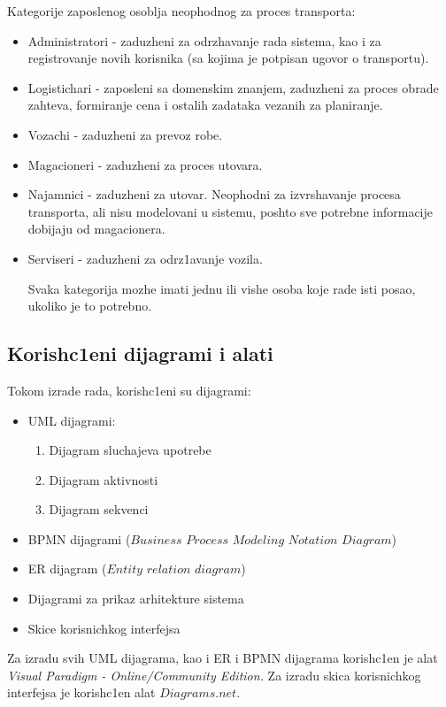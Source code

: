 Kategorije zaposlenog osoblja neophodnog za proces transporta:
\begin{itemize}
    \item Administratori - zaduzheni za odrzhavanje rada sistema, kao i za registrovanje novih korisnika (sa kojima je potpisan ugovor o transportu).
    \item Logistichari - zaposleni sa domenskim znanjem, zaduzheni za proces obrade zahteva, formiranje cena i ostalih zadataka vezanih za planiranje.
    \item Vozachi - zaduzheni za prevoz robe.
    \item Magacioneri - zaduzheni za proces utovara.
    \item Najamnici - zaduzheni za utovar. Neophodni za izvrshavanje procesa transporta, ali nisu modelovani u sistemu, poshto sve potrebne informacije dobijaju od magacionera.  
    \item Serviseri - zaduzheni za odrz1avanje vozila.
    
Svaka kategorija mozhe imati jednu ili vishe osoba koje rade isti posao, ukoliko je to potrebno.

\end{itemize}

\subsection{Korish\-c1eni dijagrami i alati}
Tokom izrade rada, korish\-c1eni su dijagrami:
\begin{itemize}
    \item UML dijagrami:
    \begin{enumerate}
     \item Dijagram sluchajeva upotrebe
    \item Dijagram aktivnosti
    \item Dijagram sekvenci
    \end{enumerate}
    \item BPMN dijagrami ($Business$ $Process$ $Modeling$ $Notation$ $Diagram$)
    \item ER dijagram ($Entity$ $relation$ $diagram$)
    \item Dijagrami za prikaz arhitekture sistema
    \item Skice korisnichkog interfejsa
    
\end{itemize}

Za izradu svih UML dijagrama, kao i ER i BPMN dijagrama korish\-c1en je alat \selectfont
\textit{Visual Paradigm - Online/Community Edition.}
\selectfont
Za izradu skica korisnichkog interfejsa je korish\-c1en alat $Diagrams.net$.
